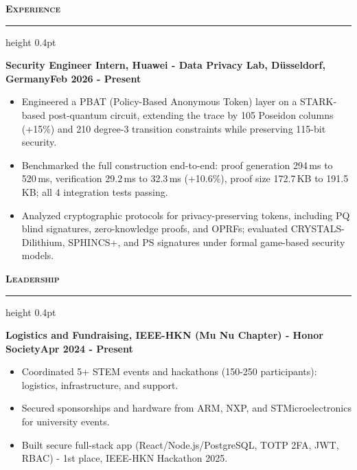 \documentclass[a4paper,10pt]{article}
\newcommand{\cventry}[2]{\noindent\begin{minipage}[t]{\linewidth}\textbf{#1}\hfill\textbf{#2}\end{minipage}}
\newcommand{\mysection}[1]{%
  \vspace{0.3ex}
  {\large\bfseries\scshape\color{myblue} #1}\enspace%
  \leaders\hrule height 0.4pt\hfill\kern0pt
  \vspace{-0.2em}
}
\begin{document}
\mysection{Experience}
\cventry{Security Engineer Intern, Huawei - Data Privacy Lab, D\"usseldorf, Germany}{Feb 2026 - Present}
\begin{itemize}
    \item Engineered a PBAT (Policy-Based Anonymous Token) layer on a STARK-based post-quantum circuit, extending the trace by 105 Poseidon columns (+15\%) and 210 degree-3 transition constraints while preserving 115-bit security.
    \item Benchmarked the full construction end-to-end: proof generation 294\,ms to 520\,ms, verification 29.2\,ms to 32.3\,ms (+10.6\%), proof size 172.7\,KB to 191.5\,KB; all 4 integration tests passing.
    \item Analyzed cryptographic protocols for privacy-preserving tokens, including PQ blind signatures, zero-knowledge proofs, and OPRFs; evaluated CRYSTALS-Dilithium, SPHINCS+, and PS signatures under formal game-based security models.
\end{itemize}

\mysection{Leadership}
\cventry{Logistics and Fundraising, IEEE-HKN (Mu Nu Chapter) - Honor Society}{Apr 2024 - Present}
\begin{itemize}
    \item Coordinated 5+ STEM events and hackathons (150-250 participants): logistics, infrastructure, and support.
    \item Secured sponsorships and hardware from ARM, NXP, and STMicroelectronics for university events.
    \item Built secure full-stack app (React/Node.js/PostgreSQL, TOTP 2FA, JWT, RBAC) - 1st place, IEEE-HKN Hackathon 2025.
\end{itemize}
\end{document}
